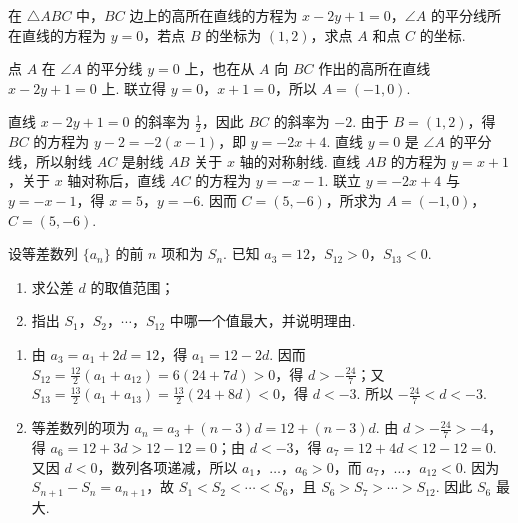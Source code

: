 \begin{problem}
在 \(\triangle ABC\) 中，\(BC\) 边上的高所在直线的方程为 \(x-2y+1=0\)，\(\angle A\) 的平分线所在直线的方程为 \(y=0\)，若点 \(B\) 的坐标为 \(\left(1,2\right)\)，求点 \(A\) 和点 \(C\) 的坐标.

\begin{solution}
点 \(A\) 在 \(\angle A\) 的平分线 \(y=0\) 上，也在从 \(A\) 向 \(BC\) 作出的高所在直线 \(x-2y+1=0\) 上. 联立得 \(y=0\)，\(x+1=0\)，所以 \(A=(-1,0)\).

直线 \(x-2y+1=0\) 的斜率为 \(\frac{1}{2}\)，因此 \(BC\) 的斜率为 \(-2\). 由于 \(B=(1,2)\)，得 \(BC\) 的方程为 \(y-2=-2(x-1)\)，即 \(y=-2x+4\). 直线 \(y=0\) 是 \(\angle A\) 的平分线，所以射线 \(AC\) 是射线 \(AB\) 关于 \(x\) 轴的对称射线. 直线 \(AB\) 的方程为 \(y=x+1\)，关于 \(x\) 轴对称后，直线 \(AC\) 的方程为 \(y=-x-1\). 联立 \(y=-2x+4\) 与 \(y=-x-1\)，得 \(x=5\)，\(y=-6\). 因而 \(C=(5,-6)\)，所求为 \(A=(-1,0)\)，\(C=(5,-6)\).
\end{solution}
\end{problem}

\begin{problem}
设等差数列 \(\{a_{n}\}\) 的前 \(n\) 项和为 \(S_{n}\). 已知 \(a_{3}=12\)，\(S_{12}>0\)，\(S_{13}<0\).

\begin{enumerate}
\item 求公差 \(d\) 的取值范围；
\item 指出 \(S_{1}\)，\(S_{2}\)，\(\cdots\)，\(S_{12}\) 中哪一个值最大，并说明理由.
\end{enumerate}
\begin{solution}
\begin{enumerate}
\item 由 \(a_3=a_1+2d=12\)，得 \(a_1=12-2d\). 因而
\(S_{12}=\frac{12}{2}(a_1+a_{12})=6\left(24+7d\right)>0\)，得 \(d>-\frac{24}{7}\)；又
\(S_{13}=\frac{13}{2}(a_1+a_{13})=\frac{13}{2}\left(24+8d\right)<0\)，得 \(d<-3\). 所以 \(-\frac{24}{7}<d<-3\).
\item 等差数列的项为 \(a_n=a_3+(n-3)d=12+(n-3)d\). 由 \(d>-\frac{24}{7}>-4\)，得 \(a_6=12+3d>12-12=0\)；由 \(d<-3\)，得 \(a_7=12+4d<12-12=0\). 又因 \(d<0\)，数列各项递减，所以 \(a_1\)，\(\ldots\)，\(a_6>0\)，而 \(a_7\)，\(\ldots\)，\(a_{12}<0\). 因为 \(S_{n+1}-S_n=a_{n+1}\)，故 \(S_1<S_2<\cdots<S_6\)，且 \(S_6>S_7>\cdots>S_{12}\). 因此 \(S_6\) 最大.
\end{enumerate}
\end{solution}
\end{problem}
